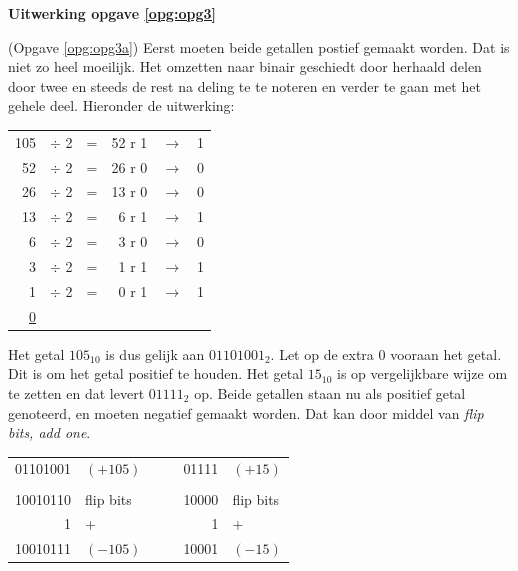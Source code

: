 \documentclass[a4paper,12pt,addpoints,fleqn,dutch]{tisdexam}
\begin{document}
\begin{questions}
\vspace{1em}

\textbf{Uitwerking opgave \ref{opg:opg3}}

(Opgave \ref{opg:opg3a}) Eerst moeten beide getallen postief gemaakt worden.
Dat is niet zo heel moeilijk. Het omzetten naar binair geschiedt door herhaald
delen door twee en steeds de rest na deling te te noteren en verder te gaan
met het gehele deel. Hieronder de uitwerking:

\begin{table}[H]
  \begin{tabular}{ r c c r c c }
  105 & $\div$ 2 & = & 52 r 1 & $\rightarrow$ & 1 \\
   52 & $\div$ 2 & = & 26 r 0 & $\rightarrow$ & 0 \\
   26 & $\div$ 2 & = & 13 r 0 & $\rightarrow$ & 0 \\
   13 & $\div$ 2 & = &  6 r 1 & $\rightarrow$ & 1 \\
    6 & $\div$ 2 & = &  3 r 0 & $\rightarrow$ & 0 \\
    3 & $\div$ 2 & = &  1 r 1 & $\rightarrow$ & 1 \\
    1 & $\div$ 2 & = &  0 r 1 & $\rightarrow$ & 1 \\
   \underline{0} &   &  &     &               &
  \end{tabular}
\end{table}

Het getal $105_{10}$ is dus gelijk aan $01101001_{2}$. Let op de extra 0
vooraan het getal. Dit is om het getal positief te houden. Het getal $15_{10}$ is op
vergelijkbare wijze om te zetten en dat levert $01111_{2}$ op.
Beide getallen staan nu als positief getal genoteerd, en moeten negatief
gemaakt worden. Dat kan door middel van \textit{flip bits, add one}.

\begin{table}[H]
  \begin{tabular}{ r l c c r l  }
   01101001 & $(+105)$  & & & 01111 & $(+15)$   \\
            &           & & &       &           \\
   10010110 & flip bits & & & 10000 & flip bits \\
          1 & +         & & &     1 & +         \\  \cline{1-1} \cline{5-5}
   10010111 & $(-105)$  & & & 10001 & $(-15)$
  \end{tabular}
\end{table}


\end{questions}
\end{document}
